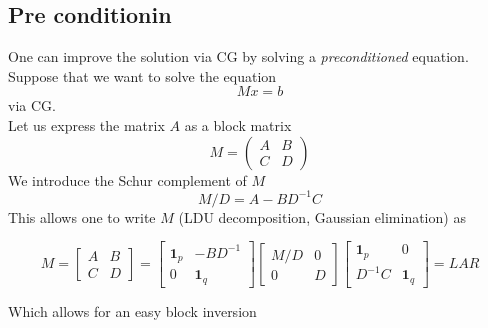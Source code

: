 \subsection{Pre conditionin}
One can improve the solution via CG by solving a \emph{preconditioned} equation. Suppose that we want to solve the equation
\begin{equation*}
    M x = b
\end{equation*}
via CG. \\
Let us express the matrix $A$ as a block matrix
\begin{equation}
    M = \begin{pmatrix*}
        A & B \\ C & D
    \end{pmatrix*}
    \label{eq:block_matrix}
\end{equation}
We introduce the Schur complement of $M$
\begin{equation}
    M/D = A - B D^{-1} C
    \label{eq:schur_complement}
\end{equation}
This allows one to write $M$ (LDU decomposition, Gaussian elimination) as 

\begin{equation*}
M=\left[\begin{array}{ll}
A & B \\
C & D
\end{array}\right]=\left[\begin{array}{cc}
\mathbf{1}_p & -B D^{-1} \\
0 & \mathbf{1}_q
\end{array}\right]\left[\begin{array}{cc}
M / D & 0 \\
0 & D
\end{array}\right]\left[\begin{array}{cc}
\mathbf{1}_p & 0 \\
D^{-1} C & \mathbf{1}_q
\end{array}\right] = L A R
\end{equation*}

Which allows for an easy block inversion

